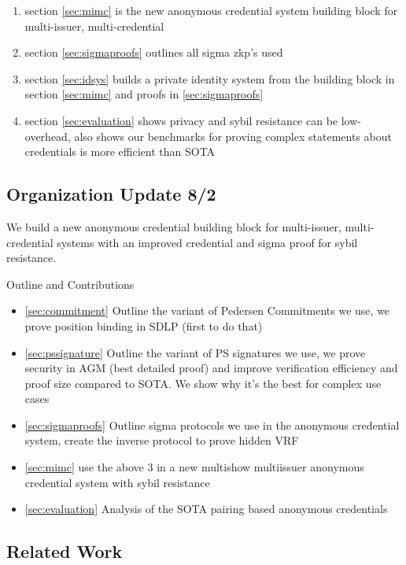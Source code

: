 \begin{enumerate}
    \item section \ref{sec:mimc} is the new anonymous credential system building block for multi-issuer, multi-credential
    \item section \ref{sec:sigmaproofs} outlines all sigma zkp's used
    \item section \ref{sec:idsys} builds a private identity system from the building block in section \ref{sec:mimc} and proofs in \ref{sec:sigmaproofs}
    \item section \ref{sec:evaluation} shows privacy and sybil resistance can be low-overhead, also shows our benchmarks for proving complex statements about credentials is more efficient than SOTA
\end{enumerate}

\subsection{Organization Update 8/2}
We build a new anonymous credential building block for multi-issuer, multi-credential systems with an improved credential and sigma proof for sybil resistance. 

Outline and Contributions
\begin{itemize}
    \item \ref{sec:commitment} Outline the variant of Pedersen Commitments we use, we prove position binding in SDLP (first to do that)
    \item \ref{sec:pssignature} Outline the variant of PS signatures we use, we prove security in AGM (best detailed proof) and improve verification efficiency and proof size compared to SOTA. We show why it's the best for complex use cases
    \item \ref{sec:sigmaproofs} Outline sigma protocols we use in the anonymous credential system, create the inverse protocol to prove hidden VRF
    \item \ref{sec:mimc} use the above 3 in a new multishow multiissuer anonymous credential system with sybil resistance
    \item \ref{sec:evaluation} Analysis of the SOTA pairing based anonymous credentials
\end{itemize}



\subsection{Related Work}

